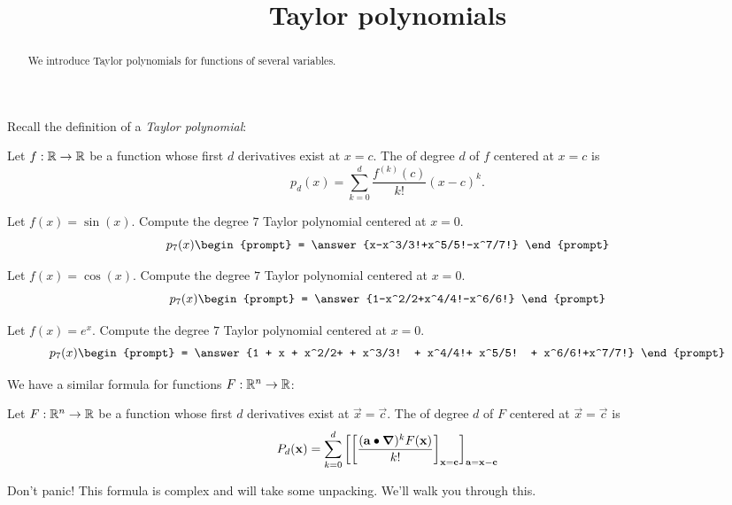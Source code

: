 \documentclass{ximera}
\title[Dig-In:]{Taylor polynomials}
\begin{document}
\begin{abstract}
  We introduce Taylor polynomials for functions of several variables.
\end{abstract}
\maketitle


Recall the definition of a \textit{Taylor polynomial}:

\begin{definition}
  Let $f:\mathbb R\to\mathbb R$ be a function whose first $d$ derivatives exist at $x=c$.
  The  of degree $d$ of $f$ centered at $x=c$ is
  \[
  p_d(x) = \sum_{k=0}^d\frac{f^{(k)}(c)}{k!}(x-c)^k.
  \]
\end{definition}

\begin{question}
  Let $f(x) = \sin(x)$. Compute the degree $7$ Taylor polynomial
  centered at $x=0$.
  \[
  p_7(x)\begin{prompt}
    = \answer{x-x^3/3!+x^5/5!-x^7/7!}
  \end{prompt}
  \]
  \begin{question}
  Let $f(x) = \cos(x)$. Compute the degree $7$ Taylor polynomial
  centered at $x=0$.
  \[
  p_7(x)\begin{prompt}
    = \answer{1-x^2/2+x^4/4!-x^6/6!}
  \end{prompt}
  \]
  \begin{question}
    Let $f(x) = e^x$. Compute the degree $7$ Taylor polynomial
  centered at $x=0$.
    \[
    p_7(x)\begin{prompt}
      = \answer{1 + x + x^2/2+ + x^3/3! + x^4/4!+ x^5/5! + x^6/6!+x^7/7!}
    \end{prompt}
    \]
  \end{question}
\end{question}
\end{question}

We have a similar formula for functions $F:\mathbb R^n\to \mathbb R$:
\begin{definition}
  Let $F:\mathbb R^n\to\mathbb R$ be a function whose first $d$ derivatives exist at
  $\vec{x}=\vec{c}$.  The  of degree $d$ of $F$
  centered at $\vec{x}=\vec{c}$ is
  \[
  P_d(\mathbf{x}) = \sum_{k=0}^d \bigg[ \bigg[ \frac{(\mathbf{a}\bullet \boldsymbol\nabla)^k F(\mathbf{x})}{k!} \bigg]_{\mathbf{x}=\mathbf{c}} \bigg]_{\mathbf{a}=\mathbf{x}-\mathbf{c}}
  \]
\end{definition}
Don't panic! This formula is complex and will take some
unpacking. We'll walk you through this.
\end{document}
